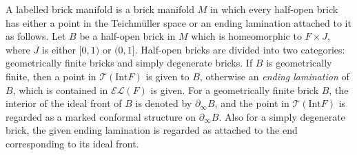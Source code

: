\documentclass{amsart}
\theoremstyle{definition}
\numberwithin{figure}{section}
\numberwithin{equation}{section}
\newcommand{\teich}{\mathcal{T}}
\newcommand{\EL}{\mathcal{EL}}
\def\ck{\mathcal{K}}
\def\part{\partial}
\def\Int{\mathrm{Int}}
\def\sg{\sigma}
\begin{document}
%

A labelled brick manifold is a brick manifold $M$ in which every half-open brick has either a point in the Teichm\"{u}ller space or an ending lamination  attached to it  as follows.
Let $B$ be a half-open brick in $M$ which is homeomorphic to $F \times J$, where $J$ is either $[0,1)$ or $(0,1]$.
Half-open bricks are divided into two categories: geometrically finite bricks and simply degenerate bricks.
If $B$ is geometrically finite, then a point in $\teich(\Int F)$ is given to $B$, 
 otherwise an \emph{ending lamination} of $B$, which is contained in $\EL(F)$ is given.
For a geometrically finite brick $B$, the interior of the ideal front of $B$ is 
denoted by $\part_\infty B$, and the point in $\teich(\Int F)$ is regarded as a marked conformal structure on $\partial_\infty B$.
Also for a simply degenerate brick, the given ending lamination is regarded as attached to the end corresponding to its ideal front.
\end{document}
